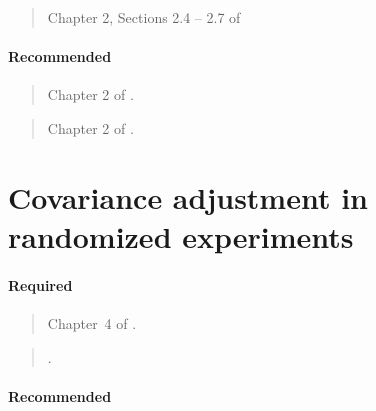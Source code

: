 \documentclass[12pt]{article}
\begin{document}
\begin{verse}
  Chapter 2, Sections 2.4 -- 2.7 of 
\end{verse}

\paragraph*{Recommended}

\begin{verse}
  Chapter 2 of .
\end{verse}

\begin{verse}
  Chapter 2 of .
\end{verse}

\section{Covariance adjustment in randomized experiments}

\paragraph*{Required}

\begin{verse}
  Chapter~4 of .
\end{verse}

\begin{verse}
  .
\end{verse}

\begin{verse}  \end{verse}

\paragraph*{Recommended}

\begin{verse}  \end{verse}

\begin{verse}  \end{verse}

\begin{verse}  \end{verse}

\begin{verse}  \end{verse}
\end{document}
